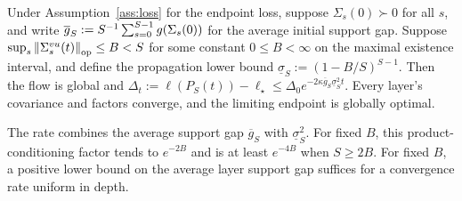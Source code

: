 \begin{theorem}\label{thm:resnet-finite}
Under Assumption~\ref{ass:loss} for the endpoint loss, suppose
$\Sigma_s(0)\succ0$ for all $s$, and write
$\overline g_S:=S^{-1}\sum_{s=0}^{S-1}g(\Sigma_s(0))$ for the average initial
support gap. Suppose
$\sup_s\left\lVert \Sigma^{vu}_s(t) \right\rVert_{\mathrm{op}}\le B<S$ for some constant $0 \leq B < \infty$ on the maximal existence interval,
and define the propagation lower bound $\underline{\sigma}_S:=(1-B/S)^{S-1}$.
Then the flow is global and
\(\Delta_t:=\ell(P_S(t))-\ell_\star
 \le\Delta_0e^{-2\kappa\overline g_S\underline{\sigma}_S^2t}\).
Every layer's covariance and factors converge, and the limiting endpoint
is globally optimal.
\end{theorem}

The rate combines the average support gap $\overline g_S$ with
$\underline{\sigma}_S^2$. For fixed $B$, this product-conditioning factor tends to
$e^{-2B}$ and is at least $e^{-4B}$ when $S\ge2B$.
For fixed $B$, a positive lower bound on the average layer support gap suffices for a convergence rate uniform in depth.

